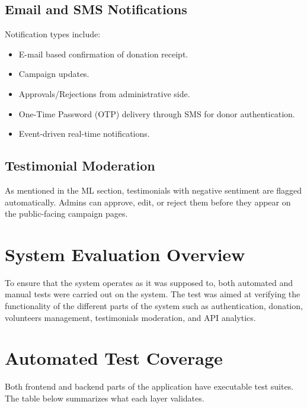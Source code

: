 \documentclass{thesis-library}
\begin{document}
\subsection{Email and SMS Notifications}
Notification types include:
\begin{itemize}
    \item E-mail based confirmation of donation receipt.
    \item Campaign updates.
    \item Approvals/Rejections from administrative side.
    \item One-Time Password (OTP) delivery through SMS for donor authentication.
    \item Event-driven real-time notifications.
\end{itemize}

\subsection{Testimonial Moderation}
As mentioned in the ML section, testimonials with negative sentiment are flagged automatically. Admins can approve, edit, or reject them before they appear on the public-facing campaign pages.


\section{System Evaluation Overview}
To ensure that the system operates as it was supposed to, both automated and manual tests were carried out on the system. The test was aimed at verifying the functionality of the different parts of the system such as authentication, donation, volunteers management, testimonials moderation, and API analytics.

\section{Automated Test Coverage}
Both frontend and backend parts of the application have executable test suites. The table below summarizes what each layer validates.
\end{document}
